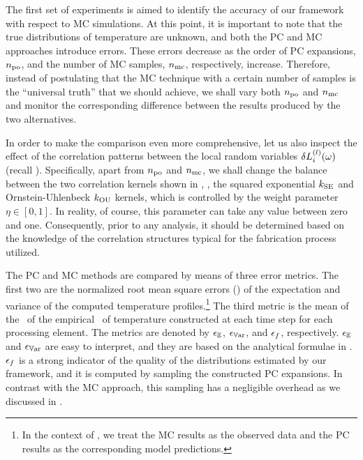 The first set of experiments is aimed to identify the accuracy of our framework with respect to MC simulations.
At this point, it is important to note that the true distributions of temperature are unknown, and both the PC and MC approaches introduce errors.
These errors decrease as the order of PC expansions, ${n_\text{po}}$, and the number of MC samples, ${n_\text{mc}}$, respectively, increase.
Therefore, instead of postulating that the MC technique with a certain number of samples is the ``universal truth'' that we should achieve, we shall vary both ${n_\text{po}}$ and ${n_\text{mc}}$ and monitor the corresponding difference between the results produced by the two alternatives.

In order to make the comparison even more comprehensive, let us also inspect the effect of the correlation patterns between the local random variables $\delta L^{(l)}_i(\omega)$ (recall ).
Specifically, apart from ${n_\text{po}}$ and ${n_\text{mc}}$, we shall change the balance between the two correlation kernels shown in , \ie, the squared exponential $\fCorr_\SE$ and Ornstein-Uhlenbeck $\fCorr_\OU$ kernels, which is controlled by the weight parameter $\eta \in [0, 1]$.
In reality, of course, this parameter can take any value between zero and one.
Consequently, prior to any analysis, it should be determined based on the knowledge of the correlation structures typical for the fabrication process utilized.

The PC and MC methods are compared by means of three error metrics.
The first two are the normalized root mean square errors (\nrmses) of the expectation and variance of the computed temperature profiles.\footnote{In the context of \nrmses, we treat the MC results as the observed data and the PC results as the corresponding model predictions.}
The third metric is the mean of the \nrmses\ of the empirical \pdfs\ of temperature constructed at each time step for each processing element.
The metrics are denoted by $\epsilon_\mathbb{E}$, $\epsilon_{\mathbb{V}\text{ar}}$, and $\epsilon_f$, respectively.
$\epsilon_\mathbb{E}$ and $\epsilon_{\mathbb{V}\text{ar}}$ are easy to interpret, and they are based on the analytical formulae in .
$\epsilon_f$ is a strong indicator of the quality of the distributions estimated by our framework, and it is computed by sampling the constructed PC expansions.
In contrast with the MC approach, this sampling has a negligible overhead as we discussed in .

